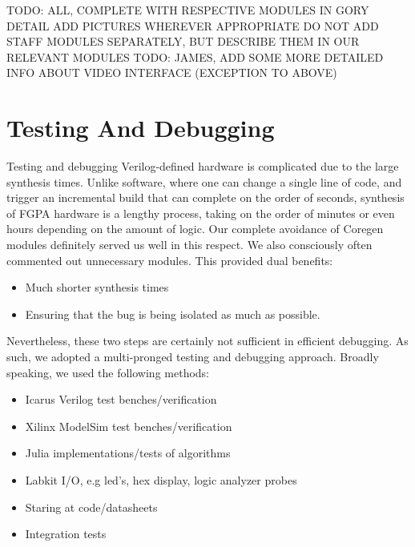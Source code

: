 \documentclass{article}
\begin{document}
TODO: ALL, COMPLETE WITH RESPECTIVE MODULES IN GORY DETAIL
ADD PICTURES WHEREVER APPROPRIATE
DO NOT ADD STAFF MODULES SEPARATELY, BUT DESCRIBE THEM IN OUR RELEVANT MODULES
TODO: JAMES, ADD SOME MORE DETAILED INFO ABOUT VIDEO INTERFACE
(EXCEPTION TO ABOVE)

\section{Testing And Debugging}

Testing and debugging Verilog-defined hardware is complicated due to the large synthesis times.
Unlike software, where one can change a single line of code,
and trigger an incremental build that can complete on the order of seconds,
synthesis of FGPA hardware is a lengthy process,
taking on the order of minutes or even hours depending on the amount of logic.
Our complete avoidance of Coregen modules definitely served us well in this respect.
We also consciously often commented out unnecessary modules.
This provided dual benefits:
\begin{itemize}
\item Much shorter synthesis times
\item Ensuring that the bug is being isolated as much as possible.
\end{itemize}
Nevertheless, these two steps are certainly not sufficient in efficient debugging.
As such, we adopted a multi-pronged testing and debugging approach.
Broadly speaking, we used the following methods:
\begin{itemize}
\item Icarus Verilog test benches/verification
\item Xilinx ModelSim test benches/verification
\item Julia implementations/tests of algorithms
\item Labkit I/O, e.g led's, hex display, logic analyzer probes
\item Staring at code/datasheets
\item Integration tests
\end{itemize}
\end{document}
